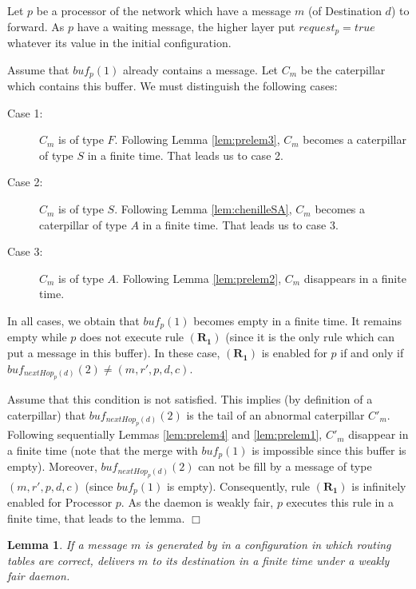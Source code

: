 \documentclass[11pt]{article}
\newtheorem{lemma}{Lemma}
\newenvironment{proof}{{\noindent\bf Proof. } }{{\hfill $\Box$}}
\begin{document}
\begin{proof}
Let $p$ be a processor of the network which have a message $m$ (of Destination $d$) to forward. As $p$ have a waiting message, the higher layer put $request_{p}=true$ whatever its value in the initial configuration.

Assume that $buf_{p}(1)$ already contains a message. Let $C_{m}$ be the caterpillar which contains this buffer. We must distinguish the following cases:

\begin{description}
\item [Case 1:] $C_{m}$ is of type $F$. Following Lemma \ref{lem:prelem3}, $C_{m}$ becomes a caterpillar of type $S$ in a finite time. That leads us to case 2.
\item [Case 2:] $C_{m}$ is of type $S$. Following Lemma \ref{lem:chenilleSA}, $C_{m}$ becomes a caterpillar of type $A$ in a finite time. That leads us to case 3.
\item [Case 3:] $C_{m}$ is of type $A$. Following Lemma \ref{lem:prelem2}, $C_{m}$ disappears in a finite time.
\end{description}

In all cases, we obtain that $buf_{p}(1)$ becomes empty in a finite time. It remains empty while $p$ does not execute rule $\boldsymbol{(R_{1})}$ (since it is the only rule which can put a message in this buffer). In these case, $\boldsymbol{(R_{1})}$ is enabled for $p$ if and only if $buf_{nextHop_{p}(d)}(2)\neq(m,r',p,d,c)$. 

Assume that this condition is not satisfied. This implies (by definition of a caterpillar) that $buf_{nextHop_{p}(d)}(2)$ is the tail of an abnormal caterpillar $C'_{m}$. Following sequentially Lemmas \ref{lem:prelem4} and \ref{lem:prelem1}, $C'_{m}$ disappear in a finite time (note that the merge with $buf_{p}(1)$ is impossible since this buffer is empty). Moreover, $buf_{nextHop_{p}(d)}(2)$ can not be fill by a message of type $(m,r',p,d,c)$ (since $buf_{p}(1)$ is empty). Consequently, rule $\boldsymbol{(R_{1})}$ is infinitely enabled for Processor $p$. As the daemon is weakly fair, $p$ executes this rule in a finite time, that leads to the lemma.
\end{proof}

\begin{lemma} \label{lem:transportD}
If a message $m$ is generated by \AD in a configuration in which routing tables are correct, \AD delivers $m$ to its destination in a finite time under a weakly fair daemon.
\end{lemma}
\end{document}
